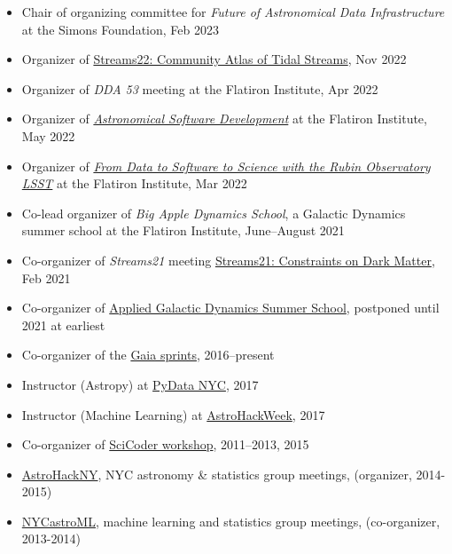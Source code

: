 \documentclass[12pt, letterpaper]{apw-cv}
\begin{document}
\begin{itemize}
    \item Chair of organizing committee for \textit{Future of Astronomical Data Infrastructure} at the Simons Foundation, Feb 2023
    \item Organizer of \href{https://stellarstreams.org/streams22}{Streams22: Community Atlas of Tidal Streams}, Nov 2022
    \item Organizer of \textit{DDA 53} meeting at the Flatiron Institute, Apr 2022
    \item Organizer of \href{https://code.astrodata.nyc/}{\textit{Astronomical Software Development}} at the Flatiron Institute, May 2022
    \item Organizer of \href{https://indico.flatironinstitute.org/event/2777/}{\textit{From Data to Software to Science with the Rubin Observatory LSST}} at the Flatiron Institute, Mar 2022
    \item Co-lead organizer of \textit{Big Apple Dynamics School}, a Galactic Dynamics summer school at the Flatiron Institute, June--August 2021
    \item Co-organizer of \textit{Streams21} meeting \href{https://stellarstreams.org/streams21}{Streams21: Constraints on Dark Matter}, Feb 2021
    \item Co-organizer of \href{http://galacticdynamics.nyc/}{Applied Galactic Dynamics Summer School}, postponed until 2021 at earliest
    \item Co-organizer of the \href{http://gaia.lol}{Gaia sprints}, 2016--present
    \item Instructor (Astropy) at \href{http://pydata.org/nyc2017}{PyData NYC}, 2017
    \item Instructor (Machine Learning) at \href{http://astrohackweek.org}{AstroHackWeek}, 2017
    \item Co-organizer of \href{http://scicoder.org}{SciCoder workshop}, 2011--2013, 2015
    \item \href{https://groups.google.com/forum/#!forum/astrohackny}{AstroHackNY}, NYC astronomy \& statistics group meetings, (organizer, 2014-2015)
    \item \href{https://github.com/adrn/nycastroml}{NYCastroML}, machine learning and statistics group meetings, (co-organizer, 2013-2014)
\end{itemize}
\end{document}
